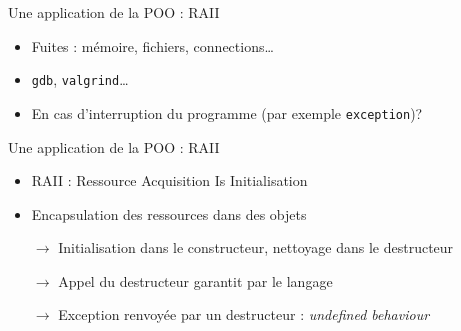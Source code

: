 \begin{frame}{Une application de la POO : RAII}
  \begin{itemize}
  \item Fuites : mémoire, fichiers, connections\dots{}
  \item \texttt{gdb}, \texttt{valgrind}\dots{}
  \item En cas d'interruption du programme (par exemple \texttt{exception})?
  \end{itemize}
\end{frame}

\begin{frame}{Une application de la POO : RAII}
  \begin{itemize}
  \item RAII : Ressource Acquisition Is Initialisation
  \item Encapsulation des ressources dans des objets
  \item[$\rightarrow$] Initialisation dans le constructeur, nettoyage dans le destructeur
  \item[$\rightarrow$] Appel du destructeur garantit par le langage
  \item[$\rightarrow$] Exception renvoyée par un destructeur : \textit{undefined behaviour}
  \end{itemize}
\end{frame}
